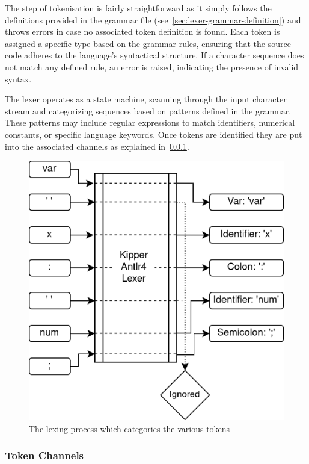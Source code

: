 The step of tokenisation is fairly straightforward as it simply follows the definitions provided in the grammar file (see~\ref{sec:lexer-grammar-definition}) and throws errors in case no associated token definition is found. Each token is assigned a specific type based on the grammar rules, ensuring that the source code adheres to the language's syntactical structure. If a character sequence does not match any defined rule, an error is raised, indicating the presence of invalid syntax.

The lexer operates as a state machine, scanning through the input character stream and categorizing sequences based on patterns defined in the grammar. These patterns may include regular expressions to match identifiers, numerical constants, or specific language keywords. Once tokens are identified they are put into the associated channels as explained in~\ref{sec:token-channels}.

\begin{figure}[h!]
	\centering
	\includegraphics[scale=1]{./pics/Lexer-Algorithm.drawio}
	\caption{The lexing process which categories the various tokens}
	\label{fig:implementation:Lexer-Algorithm}
\end{figure}

\subsubsection{Token Channels}
\label{sec:token-channels}


